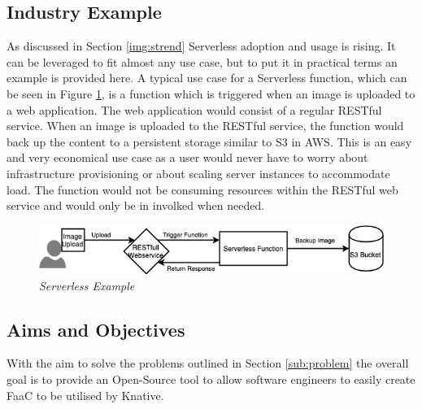 \subsection{Industry Example}
\label{sub:example}
As discussed in Section \ref{img:strend} \gls{Serverless} adoption and usage is rising. It can be leveraged to fit almost any use case, but to put it in practical terms an example is provided here. A typical use case for a \gls{Serverless} function, which can be seen in Figure \ref{img:servex}, is a function which is triggered when an image is uploaded to a web application. The web application would consist of a regular \gls{REST}ful service. When an image is uploaded to the \gls{REST}ful service, the function would back up the content to a persistent storage similar to \gls{S3} in \gls{AWS}. This is an easy and very economical use case as a user would never have to worry about infrastructure provisioning or about scaling server instances to accommodate load. The function would not be consuming resources within the \gls{REST}ful web service and would only be in involked when needed.
\begin{figure}[!ht]
\centering
\includegraphics*[width=1\textwidth]{images/server-fun.png}
\caption{\em Serverless Example}
\label{img:servex}
\end{figure}

\subsection{Aims and Objectives}
\label{sub:aims}
With the aim to solve the problems outlined in Section \ref{sub:problem} the overall goal is to provide an \gls{Open-Source} tool to allow software engineers to easily create \gls{FaaC} to be utilised by \gls{Knative}. 

